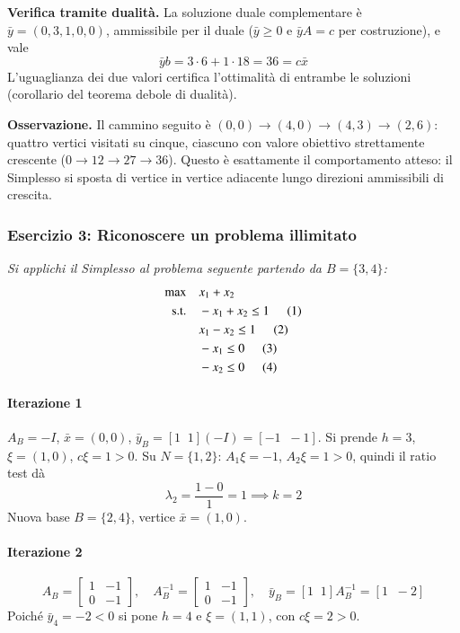 \documentclass[12pt]{extarticle} %
\begin{document}
\noindent\textbf{Verifica tramite dualità.} La soluzione duale complementare è $\bar{y} = (0,3,1,0,0)$, ammissibile per il duale ($\bar{y} \ge 0$ e $\bar{y}A = c$ per costruzione), e vale
\[
\bar{y}b = 3\cdot 6 + 1\cdot 18 = 36 = c\bar{x}
\]
L'uguaglianza dei due valori certifica l'ottimalità di entrambe le soluzioni (corollario del teorema debole di dualità).

\noindent\textbf{Osservazione.} Il cammino seguito è $(0,0) \to (4,0) \to (4,3) \to (2,6)$: quattro vertici visitati su cinque, ciascuno con valore obiettivo strettamente crescente ($0 \to 12 \to 27 \to 36$). Questo è esattamente il comportamento atteso: il Simplesso si sposta di vertice in vertice adiacente lungo direzioni ammissibili di crescita.

\subsubsection{Esercizio 3: Riconoscere un problema illimitato}
\textit{Si applichi il Simplesso al problema seguente partendo da $B = \{3,4\}$:}
\[
\begin{aligned}
\max \quad & x_1 + x_2 \\
\text{s.t.} \quad & -x_1 + x_2 \le 1 \hspace{0.5cm}(1)\\
& x_1 - x_2 \le 1 \hspace{0.5cm}(2)\\
& -x_1 \le 0 \hspace{0.5cm}(3)\\
& -x_2 \le 0 \hspace{0.5cm}(4)
\end{aligned}
\]

\paragraph{Iterazione 1}
$A_B = -I$, $\bar{x} = (0,0)$, $\bar{y}_B = [1\;\;1](-I) = [-1\;\;-1]$. Si prende $h = 3$, $\xi = (1,0)$, $c\xi = 1 > 0$.
Su $N = \{1,2\}$: $A_1\xi = -1$, $A_2\xi = 1 > 0$, quindi il ratio test dà
\[
\lambda_2 = \frac{1-0}{1} = 1 \implies k = 2
\]
Nuova base $B = \{2,4\}$, vertice $\bar{x} = (1,0)$.

\paragraph{Iterazione 2}
\[
A_B = \begin{bmatrix} 1 & -1\\ 0 & -1\end{bmatrix}, \quad A_B^{-1} = \begin{bmatrix} 1 & -1\\ 0 & -1\end{bmatrix}, \quad \bar{y}_B = [1 \;\; 1]A_B^{-1} = [1 \;\; -2]
\]
Poiché $\bar{y}_4 = -2 < 0$ si pone $h = 4$ e $\xi = (1,1)$, con $c\xi = 2 > 0$.
\end{document}
